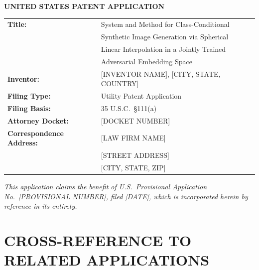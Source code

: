 \documentclass[12pt,letterpaper]{article}
\begin{document}

\begin{titlepage}
\centering
\vspace*{1in}

{\Large\bfseries UNITED STATES PATENT APPLICATION}

\vspace{0.4in}

\begin{tabular}{ll}
\textbf{Title:}      & System and Method for Class-Conditional \\
                     & Synthetic Image Generation via Spherical \\
                     & Linear Interpolation in a Jointly Trained \\
                     & Adversarial Embedding Space \\[6pt]
\textbf{Inventor:}   & [INVENTOR NAME], [CITY, STATE, COUNTRY] \\[6pt]
\textbf{Filing Type:} & Utility Patent Application \\[6pt]
\textbf{Filing Basis:} & 35 U.S.C.\ \S 111(a) \\[6pt]
\textbf{Attorney Docket:} & [DOCKET NUMBER] \\[6pt]
\textbf{Correspondence Address:} & [LAW FIRM NAME] \\
                     & [STREET ADDRESS] \\
                     & [CITY, STATE, ZIP] \\
\end{tabular}

\vspace{0.5in}

\textit{This application claims the benefit of U.S.\ Provisional Application
No.\ [PROVISIONAL NUMBER], filed [DATE], which is incorporated herein by
reference in its entirety.}

\end{titlepage}

\newpage
\tableofcontents
\newpage

\section*{CROSS-REFERENCE TO RELATED APPLICATIONS}
\end{document}
